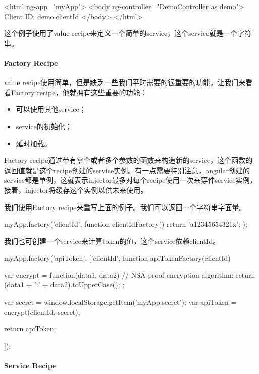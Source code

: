 	  
	  \begin{HTML}
	<html ng-app="myApp">
  		<body ng-controller="DemoController as demo">
    		Client ID: {{demo.clientId}}
 		</body>
	</html>	  
	  \end{HTML}
	  
	  这个例子使用了value recipe来定义一个简单的service，这个service就是一个字符串。
	  
	  
	  \paragraph{Factory Recipe}
	  
	  value recipe使用简单，但是缺乏一些我们平时需要的很重要的功能，让我们来看看Factory recipe，他就拥有这些重要的功能：
	  
	  \begin{itemize}
	  	\item 可以使用其他service；
	  	\item service的初始化；
	  	\item 延时加载。
	  \end{itemize}
	  
	  
	  Factory recipe通过带有零个或者多个参数的函数来构造新的service，这个函数的返回值就是这个recipe创建的service实例。有一点需要特别注意，angular创建的service都是单例，这就表示injector最多对每个recipe使用一次来穿件service实例，接着，injector将缓存这个实例以供未来使用。
	  
	  我们使用Factory recipe来重写上面的例子。我们可以返回一个字符串字面量。
	  
	  \begin{JavaScript}
myApp.factory('clientId', function clientIdFactory() {
  return 'a12345654321x';
});	  
	  \end{JavaScript}
	  
	  我们也可创建一个service来计算token的值，这个service依赖clientId。
	  \begin{JavaScript}
myApp.factory('apiToken', ['clientId', function apiTokenFactory(clientId) {
  var encrypt = function(data1, data2) {
    // NSA-proof encryption algorithm:
    return (data1 + ':' + data2).toUpperCase();
  };
 
  var secret = window.localStorage.getItem('myApp.secret');
  var apiToken = encrypt(clientId, secret);
 
  return apiToken;
}]);	  
	  \end{JavaScript}
	  
	  
	  \paragraph{Service Recipe}
	  

